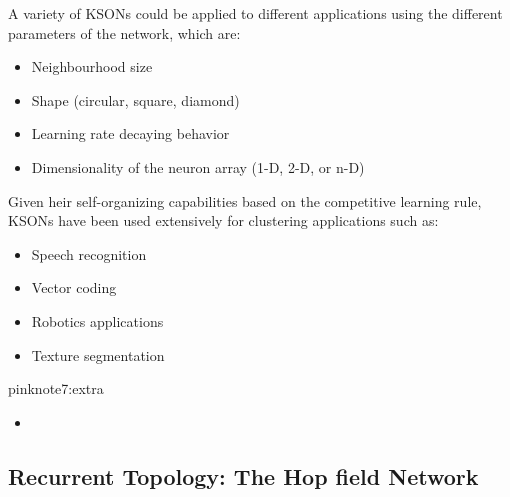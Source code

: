 \documentclass{tron}
\newcommand{\uhref}[2]{\underline{\href{#2}{\color{orange}{#1}}}}
\begin{document}

\begin{remark}[Applications]{}
	A variety of KSONs could be applied to different applications using the different parameters of the network, which are:
	\vspace{-5px}
	\begin{itemize}
		\item Neighbourhood size
		\item Shape (circular, square, diamond)
		\item Learning rate decaying behavior
		\item Dimensionality of the neuron array (1-D, 2-D, or n-D)
	\end{itemize}
	
	Given heir self-organizing capabilities based on the competitive learning rule, KSONs have been used extensively for clustering applications such as:
	\vspace{-5px}
	\begin{itemize}
		\item Speech recognition
		\item Vector coding
		\item Robotics applications
		\item Texture segmentation
	\end{itemize}
\end{remark}


\begin{note}{pink}{note7:extra}
	\begin{itemize}
		\item \uhref{Self-organizing Maps [Web]}{https://www.cs.hmc.edu/~kpang/nn/som.html}
	\end{itemize}
\end{note}


\newpage
\subsection{Recurrent Topology: The Hop field Network}


\newpage
\end{document}
